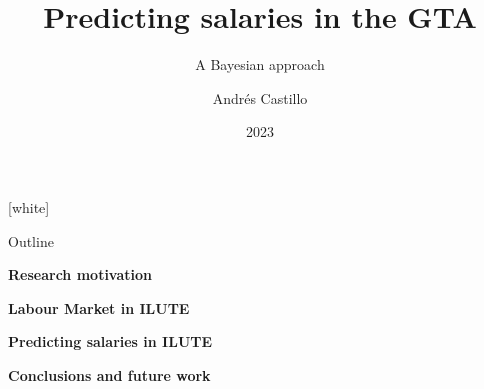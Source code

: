 \documentclass[aspectratio=169]{beamer}
\title{Predicting salaries in the GTA}
\subtitle{A Bayesian approach}
\author{Andrés Castillo}
\institute{University of Toronto}
\date{2023}
\begin{document}
{
[white]
\begin{frame}
  \titlepage
\end{frame}
}

\begin{frame}{Outline}
    \begin{enumerate}
        {\normalsize
            \item \textbf{Research motivation}
            \item \textbf{Labour Market in ILUTE}
            \item \textbf{Predicting salaries in ILUTE}
            \item \textbf{Conclusions and future work}
        }
    \end{enumerate}
\end{frame}
\end{document}
